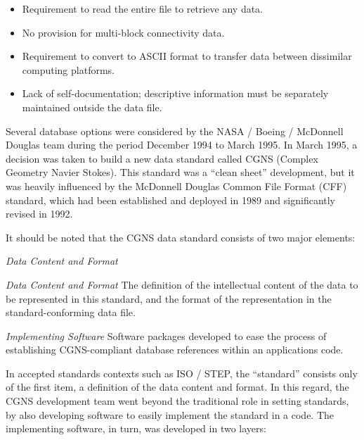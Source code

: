 \begin{itemize}
\item Requirement to read the entire file to retrieve any data.
\item No provision for multi-block connectivity data.
\item Requirement to convert to ASCII format to transfer data between
      dissimilar computing platforms.
\item Lack of self-documentation; descriptive information must be
      separately maintained outside the data file.
\end{itemize}

Several database options were considered by the NASA / Boeing /
McDonnell Douglas team during the period December 1994 to March 1995.
In March 1995, a decision was taken to build a new data standard called
CGNS (Complex Geometry Navier Stokes).
This standard was a ``clean sheet'' development, but it was heavily
influenced by the McDonnell Douglas
Common File Format
(CFF) standard, which had been established and deployed in 1989 and
significantly revised in 1992.

It should be noted that the CGNS data standard consists of two major
elements:

\begin{Ventryi}{\textit{Data Content and Format}}
   \item [\textit{Data Content and Format}]
         The definition of the intellectual content of the data to
         be represented in this standard, and the format of the
         representation in the standard-conforming data file.
   \item [\textit{Implementing Software}]
         Software packages developed to ease the process of establishing
         CGNS-compliant database references within an applications code.
\end{Ventryi}

In accepted standards contexts such as ISO / STEP, the ``standard''
consists only of the first item, a definition of the data content and
format.
In this regard, the CGNS development team went beyond the traditional
role in setting standards, by also developing software to easily
implement the standard in a code.
The implementing software, in turn, was developed in two layers:

